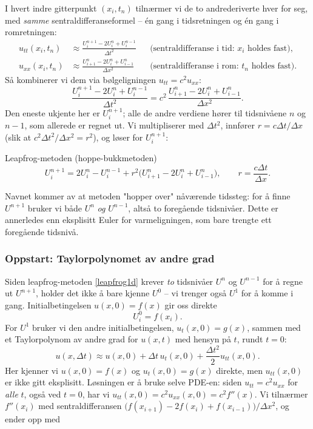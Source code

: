 I hvert indre gitterpunkt $(x_i,t_n)$ tilnærmer vi de to andrederiverte hver for seg, med \emph{samme} sentraldifferanseformel -- én gang i tidsretningen og én gang i romretningen:
\begin{align*}
u_{tt}(x_i,t_n) &\approx \frac{U_i^{n+1}-2U_i^n+U_i^{n-1}}{\Delta t^2} && \text{(sentraldifferanse i tid: $x_i$ holdes fast)},\\[0.5em]
u_{xx}(x_i,t_n) &\approx \frac{U_{i+1}^n-2U_i^n+U_{i-1}^n}{\Delta x^2} && \text{(sentraldifferanse i rom: $t_n$ holdes fast)}.
\end{align*}
Så kombinerer vi dem via bølgeligningen $u_{tt}=c^2u_{xx}$:
\[
\frac{U_i^{n+1}-2U_i^n+U_i^{n-1}}{\Delta t^2} = c^2\,\frac{U_{i+1}^n-2U_i^n+U_{i-1}^n}{\Delta x^2}.
\]
Den eneste ukjente her er $U_i^{n+1}$; alle de andre verdiene hører til tidsnivåene $n$ og $n-1$, som allerede er regnet ut. Vi multipliserer med $\Delta t^2$, innfører $r=c\Delta t/\Delta x$ (slik at $c^2\Delta t^2/\Delta x^2=r^2$), og løser for $U_i^{n+1}$:

\begin{oppsum}{Leapfrog-metoden (hoppe-bukkmetoden)}
\begin{equation}\label{leapfrog1d}
U_i^{n+1} = 2U_i^n - U_i^{n-1} + r^2\big(U_{i+1}^n-2U_i^n+U_{i-1}^n\big), \qquad r = \frac{c\Delta t}{\Delta x}.
\end{equation}
\end{oppsum}

Navnet kommer av at metoden "hopper over" nåværende tidssteg: for å finne $U^{n+1}$ bruker vi både $U^n$ \emph{og} $U^{n-1}$, altså to foregående tidsnivåer. Dette er annerledes enn eksplisitt Euler for varmeligningen, som bare trengte ett foregående tidsnivå.

\subsubsection*{Oppstart: Taylorpolynomet av andre grad}
Siden leapfrog-metoden \eqref{leapfrog1d} krever \emph{to} tidsnivåer $U^n$ og $U^{n-1}$ for å regne ut $U^{n+1}$, holder det ikke å bare kjenne $U^0$ -- vi trenger også $U^1$ for å komme i gang. Initialbetingelsen $u(x,0)=f(x)$ gir oss direkte
\[
U_i^0 = f(x_i).
\]
For $U^1$ bruker vi den andre initialbetingelsen, $u_t(x,0)=g(x)$, sammen med et Taylorpolynom av andre grad for $u(x,t)$ med hensyn på $t$, rundt $t=0$:
\[
u(x,\Delta t) \approx u(x,0) + \Delta t\, u_t(x,0) + \frac{\Delta t^2}{2}u_{tt}(x,0).
\]
Her kjenner vi $u(x,0)=f(x)$ og $u_t(x,0)=g(x)$ direkte, men $u_{tt}(x,0)$ er ikke gitt eksplisitt. Løsningen er å bruke selve PDE-en: siden $u_{tt}=c^2u_{xx}$ for \emph{alle} $t$, også ved $t=0$, har vi $u_{tt}(x,0)=c^2u_{xx}(x,0)=c^2f''(x)$. Vi tilnærmer $f''(x_i)$ med sentraldifferansen $\big(f(x_{i+1})-2f(x_i)+f(x_{i-1})\big)/\Delta x^2$, og ender opp med

